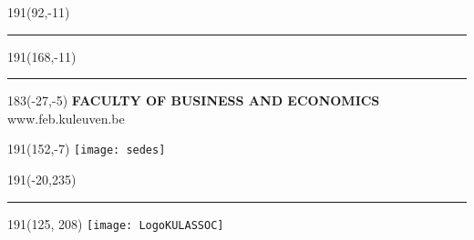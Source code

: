 \documentclass[12pt,a4paper,oneside]{report}
\begin{document}
\newpage
\thispagestyle{empty}
\sffamily
%
\begin{textblock}{191}(92,-11)
{\color{blueline}\rule{217pt}{5.5pt}}
\end{textblock}
%
\begin{textblock}{191}(168,-11)
{\color{blueline}\rule{5.5pt}{80pt}}
\end{textblock}
%
\begin{textblock}{183}(-27,-5)
\textblockcolour{}
\flushright
\fontsize{8}{10}\selectfont
\textbf{FACULTY OF BUSINESS AND ECONOMICS}\\
www.feb.kuleuven.be\\
\end{textblock}
%
\begin{textblock}{191}(152,-7)
\textblockcolour{}
\texttt{[image: sedes]}
\end{textblock}
%
\begin{textblock}{191}(-20,235)
{\color{bluetitle}\rule{544pt}{55pt}}
\end{textblock}
%
\begin{textblock}{191}(125, 208)
\textblockcolour{}
\texttt{[image: LogoKULASSOC]}
\end{textblock}
\end{document}

